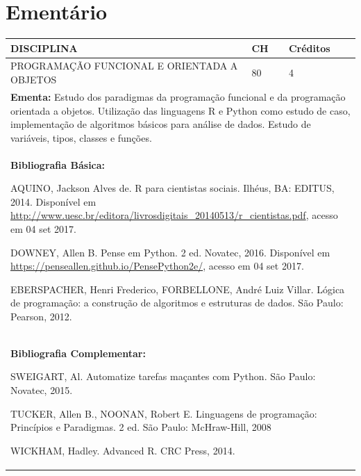 \documentclass[a4paper, 12pt, openright, oneside, german, french, english, brazil]{abntex2}
\begin{document}
\chapter{Ementário}

\begin{table}[!h]
  \footnotesize
  \centering
  \begin{tabular}{|p{100mm}|p{10mm}|p{20mm}|}
    \hline
    \textbf{DISCIPLINA} & \textbf{CH} & \textbf{Créditos} \\
    \hline
    PROGRAMAÇÃO FUNCIONAL E ORIENTADA A OBJETOS & 80 & 4 \\
    \hline
    \multicolumn{3}{|p{130mm}|}{\textbf{Ementa:} Estudo dos paradigmas da programação funcional e da programação orientada a objetos. Utilização das linguagens R e Python como estudo de caso, implementação de algoritmos básicos para análise de dados. Estudo de variáveis, tipos, classes e funções.} \\
    \hline
    \multicolumn{3}{|p{130mm}|}{\textbf{Bibliografia Básica:}

    AQUINO, Jackson Alves de. R para cientistas sociais. Ilhéus, BA: EDITUS, 2014. Disponível em \url{http://www.uesc.br/editora/livrosdigitais_20140513/r_cientistas.pdf}, acesso em 04 set 2017. 

DOWNEY, Allen B. Pense em Python. 2 ed. Novatec, 2016. Disponível em \url{https://penseallen.github.io/PensePython2e/}, acesso em 04 set 2017. 

EBERSPACHER, Henri Frederico, FORBELLONE, André Luiz Villar. Lógica de programação: a construção de algoritmos e estruturas de dados. São Paulo: Pearson, 2012.
} \\
    \hline
    \multicolumn{3}{|p{130mm}|}{\textbf{Bibliografia Complementar:}

    SWEIGART, Al. Automatize tarefas maçantes com Python. São Paulo: Novatec, 2015.

TUCKER, Allen B., NOONAN, Robert E. Linguagens de programação: Princípios e
Paradigmas. 2 ed. São Paulo: McHraw-Hill, 2008

WICKHAM, Hadley. Advanced R. CRC Press, 2014.
} \\
    \hline
  \end{tabular}
\end{table}
\end{document}
